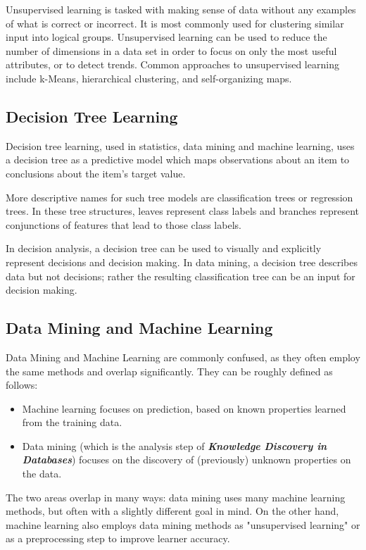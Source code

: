 \documentclass[12pt]{article}
\begin{document}
Unsupervised learning is tasked with making sense of data without any examples of what is correct or incorrect. It is most commonly used for clustering similar input into logical groups. Unsupervised learning  can be used to reduce the number of dimensions in a data set in order to focus on only the most useful attributes, or to detect trends. Common approaches to unsupervised learning include k-Means, hierarchical clustering, and self-organizing maps.

\subsection{Decision Tree Learning}
Decision tree learning, used in statistics, data mining and machine learning, uses a decision tree as a predictive model which maps observations about an item to conclusions about the item's target value. 

More descriptive names for such tree models are classification trees or regression trees. In these tree structures, leaves represent class labels and branches represent conjunctions of features that lead to those class labels.

In decision analysis, a decision tree can be used to visually and explicitly represent decisions and decision making. In data mining, a decision tree describes data but not decisions; rather the resulting classification tree can be an input for decision making.

\subsection{Data Mining and Machine Learning}
Data Mining and Machine Learning are commonly confused, as they often employ the same methods and overlap significantly. They can be roughly defined as follows:
\begin{itemize}
\item Machine learning focuses on prediction, based on known properties learned from the training data.
\item Data mining (which is the analysis step of \emph{\textbf{Knowledge Discovery in Databases}}) focuses on the discovery of (previously) unknown properties on the data.
\end{itemize}
The two areas overlap in many ways: data mining uses many machine learning methods, but often with a slightly different goal in mind. On the other hand, machine learning also employs data mining methods as "unsupervised learning" or as a preprocessing step to improve learner accuracy. 
\end{document}
